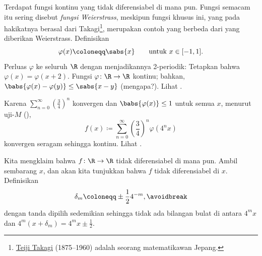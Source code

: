 \begin{example}
Terdapat fungsi kontinu yang tidak diferensiabel di mana pun.
Fungsi semacam itu sering disebut
\emph{fungsi Weierstrass},
meskipun fungsi
khusus ini, yang pada hakikatnya berasal dari
Takagi\footnote{\href{https://en.wikipedia.org/wiki/Teiji_Takagi}{Teiji
Takagi} (1875--1960) adalah seorang matematikawan Jepang.}, merupakan contoh yang berbeda dari yang diberikan Weierstrass.
Definisikan
\begin{equation*}
\varphi(x) \coloneqq \sabs{x} \qquad \text{untuk } x \in [-1,1] .
\end{equation*}
Perluas $\varphi$ ke seluruh $\R$ dengan menjadikannya
2-periodik:
Tetapkan bahwa
$\varphi(x) = \varphi(x+2)$.  Fungsi $\varphi \colon \R \to \R$
kontinu; bahkan, $\babs{\varphi(x)-\varphi(y)} \leq \sabs{x-y}$ (mengapa?).
Lihat .
\begin{myfigureht}
\caption{Fungsi 2-periodik $\varphi$.\label{fig:triangwave}}
\end{myfigureht}

Karena $\sum_{n=0}^\infty {\left(\frac{3}{4}\right)}^n$ konvergen dan $\babs{\varphi(x)} \leq
1$ untuk semua $x$, menurut uji-$M$
(),
\begin{equation*}
f(x) \coloneqq \sum_{n=0}^\infty 
{\left(\frac{3}{4}\right)}^n \varphi(4^n x)
\end{equation*}
konvergen seragam sehingga kontinu.
Lihat .

\begin{myfigureht}
\caption{Grafik fungsi $f$ yang tidak diferensiabel di mana pun.\label{fig:nowherediff}}
\end{myfigureht}

Kita mengklaim bahwa $f \colon
\R \to \R$ tidak diferensiabel di mana pun.
Ambil sembarang $x$, dan akan kita tunjukkan bahwa $f$ tidak diferensiabel di $x$.
Definisikan
\begin{equation*}
\delta_m \coloneqq \pm \frac{1}{2} 4^{-m} ,
\avoidbreak
\end{equation*}
dengan tanda dipilih sedemikian sehingga tidak ada bilangan bulat
di antara $4^m x$ dan $4^m(x+\delta_m) = 4^m x \pm \frac{1}{2}$.


\end{example}
